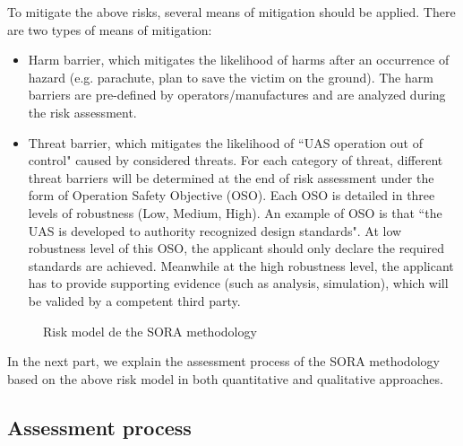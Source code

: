 \documentclass[a4paper, 10, conference]{ieeeconf}  %
\begin{document}
 To mitigate the above risks, several means of mitigation should be applied. There are two types of means of mitigation: 
\begin{itemize}
	\item Harm barrier, which mitigates the likelihood of harms after an occurrence of hazard (e.g. parachute, plan to save the victim on the ground). The harm barriers are pre-defined by operators/manufactures and are analyzed during the risk assessment. 
	\item Threat barrier, which mitigates the likelihood of ``UAS operation out of control" caused by considered threats. For each category of threat, different threat barriers will be determined at the end of risk assessment under the form of Operation Safety Objective (OSO). Each OSO is detailed in three levels of robustness (Low, Medium, High). An example of OSO is that ``the UAS is developed to authority recognized design standards"\cite{Annex_E_SORA}. At low robustness level  of this OSO, the applicant should only declare the required standards are achieved. Meanwhile at the high robustness level, the applicant has to provide supporting evidence (such as analysis, simulation), which will be valided by a competent third party.  
\end{itemize}

\begin{figure}[!ht]
    \begin{center}\vskip-2mm
	\end{center}\vskip-2mm
	\caption{Risk model de the SORA methodology}
	\label{table: riskscenario}
\end{figure}


 In the next part, we explain the assessment process of the SORA methodology based on the above risk model in both quantitative and qualitative approaches.

\subsection{Assessment process}
\end{document}

